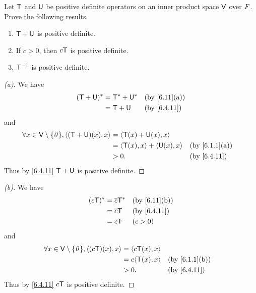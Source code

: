 \begin{ex}\label{ex:6.4.19}
	Let \(\mathsf{T}\) and \(\mathsf{U}\) be positive definite operators on an inner product space \(\mathsf{V}\) over \(\mathit{F}\).
	Prove the following results.
	\begin{enumerate}
		\item \(\mathsf{T} + \mathsf{U}\) is positive definite.
		\item If \(c > 0\), then \(c \mathsf{T}\) is positive definite.
		\item \(\mathsf{T}^{-1}\) is positive definite.
	\end{enumerate}
\end{ex}

\begin{proof}[(a)]
	We have
	\begin{align*}
		(\T + \U)^* & = \T^* + \U^* &  & \by{6.11}[a] \\
		            & = \T + \U     &  & \by{6.4.11}
	\end{align*}
	and
	\begin{align*}
		\forall x \in \V \setminus \set{\zv}, \inn{(\T + \U)(x), x} & = \inn{\T(x) + \U(x), x}                             \\
		                                                            & = \inn{\T(x), x} + \inn{\U(x), x} &  & \by{6.1.1}[a] \\
		                                                            & > 0.                              &  & \by{6.4.11}
	\end{align*}
	Thus by \cref{6.4.11} \(\mathsf{T} + \mathsf{U}\) is positive definite.
\end{proof}

\begin{proof}[(b)]
	We have
	\begin{align*}
		(c\T)^* & = \conj{c} \T^* &  & \by{6.11}[b] \\
		        & = \conj{c} \T   &  & \by{6.4.11}  \\
		        & = c \T          &  & (c > 0)
	\end{align*}
	and
	\begin{align*}
		\forall x \in \V \setminus \set{\zv}, \inn{(c \T)(x), x} & = \inn{c \T(x), x}                    \\
		                                                         & = c \inn{\T(x), x} &  & \by{6.1.1}[b] \\
		                                                         & > 0.               &  & \by{6.4.11}
	\end{align*}
	Thus by \cref{6.4.11} \(c \mathsf{T}\) is positive definite.
\end{proof}

